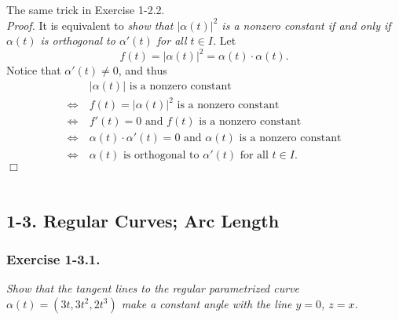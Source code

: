 \documentclass{article}
\begin{document}
The same trick in Exercise 1-2.2. \\



\emph{Proof.}
It is equivalent to
\emph{show that $|\alpha(t)|^2$ is a nonzero constant
if and only if
$\alpha(t)$ is orthogonal to $\alpha'(t)$ for all $t \in I$.}
Let $$f(t) = |\alpha(t)|^2 = \alpha(t) \cdot \alpha(t).$$
Notice that $\alpha'(t) \neq 0$, and thus
\begin{align*}
  & \: |\alpha(t)| \text{ is a nonzero constant} \\
  \Longleftrightarrow& \:
  f(t) = |\alpha(t)|^2 \text{ is a nonzero constant} \\
  \Longleftrightarrow& \:
  f'(t) = 0 \text{ and } f(t) \text{ is a nonzero constant} \\
  \Longleftrightarrow& \:
  \alpha(t) \cdot \alpha'(t) = 0 \text{ and } \alpha(t) \text{ is a nonzero constant} \\
  \Longleftrightarrow& \:
  \alpha(t) \text{ is orthogonal to } \alpha'(t) \text{ for all } t \in I.
\end{align*}
$\Box$ \\\\






\subsection*{1-3. Regular Curves; Arc Length \\}



\subsubsection*{Exercise 1-3.1.}
\emph{Show that the tangent lines to the regular parametrized curve
$\alpha(t) = (3t, 3t^2, 2t^3)$ make a constant angle with the line $y = 0$, $z = x$. } \\
\end{document}
